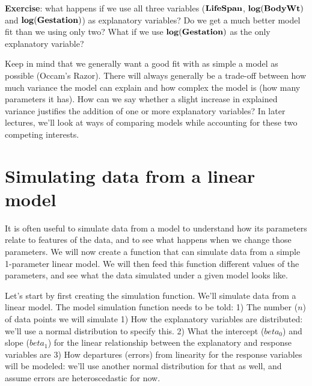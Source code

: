 \documentclass[
]{book}
\begin{document}
\textbf{Exercise}: what happens if we use all three variables (\(\bf{LifeSpan}\), \(\bf{log(BodyWt)}\) and \(\bf{log(Gestation)}\)) as explanatory variables? Do we get a much better model fit than we using only two? What if we use \(\bf{log(Gestation)}\) as the only explanatory variable?

Keep in mind that we generally want a good fit with as simple a model as possible (Occam's Razor). There will always generally be a trade-off between how much variance the model can explain and how complex the model is (how many parameters it has). How can we say whether a slight increase in explained variance justifies the addition of one or more explanatory variables? In later lectures, we'll look at ways of comparing models while accounting for these two competing interests.

\hypertarget{simulating-data-from-a-linear-model}{%
\section{Simulating data from a linear model}\label{simulating-data-from-a-linear-model}}

It is often useful to simulate data from a model to understand how its parameters relate to features of the data, and to see what happens when we change those parameters. We will now create a function that can simulate data from a simple 1-parameter linear model. We will then feed this function different values of the parameters, and see what the data simulated under a given model looks like.

Let's start by first creating the simulation function. We'll simulate data from a linear model. The model simulation function needs to be told:
1) The number (\(n\)) of data points we will simulate
1) How the explanatory variables are distributed: we'll use a normal distribution to specify this.
2) What the intercept (\(beta_0\)) and slope (\(beta_1\)) for the linear relationship between the explanatory and response variables are
3) How departures (errors) from linearity for the response variables will be modeled: we'll use another normal distribution for that as well, and assume errors are heteroscedastic for now.
\end{document}
